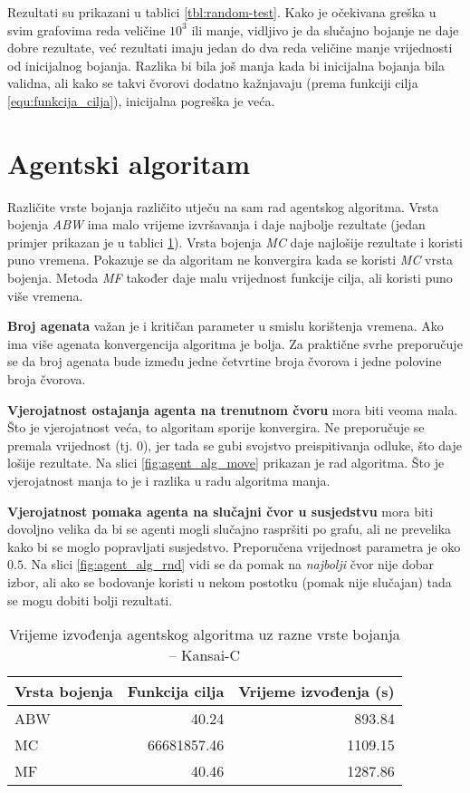 \documentclass[times, utf8, diplomski, numeric]{fer}
\begin{document}
Rezultati su prikazani u tablici \ref{tbl:random-test}.
Kako je očekivana greška u svim grafovima reda veličine $10^3$ ili manje, vidljivo je da slučajno bojanje ne daje dobre rezultate, već rezultati imaju jedan do dva reda veličine manje vrijednosti od inicijalnog bojanja. Razlika bi bila još manja kada bi inicijalna bojanja bila validna, ali kako se takvi čvorovi dodatno kažnjavaju (prema funkciji cilja \ref{equ:funkcija_cilja}), inicijalna pogreška je veća.

\section{Agentski algoritam}

Različite vrste bojanja različito utječu na sam rad agentskog algoritma. Vrsta bojenja \emph{ABW} ima malo vrijeme izvršavanja i daje najbolje rezultate (jedan primjer prikazan je u tablici \ref{tbl:aa-cs1}). Vrsta bojenja \emph{MC} daje najlošije rezultate i koristi puno vremena. Pokazuje se da algoritam ne konvergira kada se koristi \emph{MC} vrsta bojenja. Metoda \emph{MF} također daje malu vrijednost funkcije cilja, ali koristi puno više vremena.

\textbf{Broj agenata} važan je i kritičan parameter u smislu korištenja vremena. Ako ima više agenata konvergencija algoritma je bolja. Za praktične svrhe preporučuje se da broj agenata bude između jedne četvrtine broja čvorova i jedne polovine broja čvorova.

\textbf{Vjerojatnost ostajanja agenta na trenutnom čvoru} mora biti veoma mala. Što je vjerojatnost veća, to algoritam sporije konvergira. Ne preporučuje se premala vrijednost (tj. $0$), jer tada se gubi svojstvo preispitivanja odluke, što daje lošije rezultate. Na slici \ref{fig:agent_alg_move} prikazan je rad algoritma. Što je vjerojatnost manja to je i razlika u radu algoritma manja. 

\textbf{Vjerojatnost pomaka agenta na slučajni čvor u susjedstvu} mora biti dovoljno velika da bi se agenti mogli slučajno raspršiti po grafu, ali ne prevelika kako bi se moglo popravljati susjedstvo. Preporučena vrijednost parametra je oko $0.5$. Na slici \ref{fig:agent_alg_rnd} vidi se da pomak na \emph{najbolji} čvor nije dobar izbor, ali ako se bodovanje koristi u nekom postotku (pomak nije slučajan) tada se mogu dobiti bolji rezultati.


\begin{table}[htb]
	\caption{Vrijeme izvođenja agentskog algoritma uz razne vrste bojanja -- Kansai-C}
	\label{tbl:aa-cs1}
	\centering
	\begin{tabular}{|l||r|r|} \hline
	Vrsta bojenja & Funkcija cilja & Vrijeme izvođenja (s)\\ \hline \hline
	ABW & 40.24 & 893.84 \\ \hline 
	MC & 66681857.46 & 1109.15 \\ \hline
	MF & 40.46 & 1287.86 \\ \hline
	\end{tabular}
\end{table}
\end{document}
